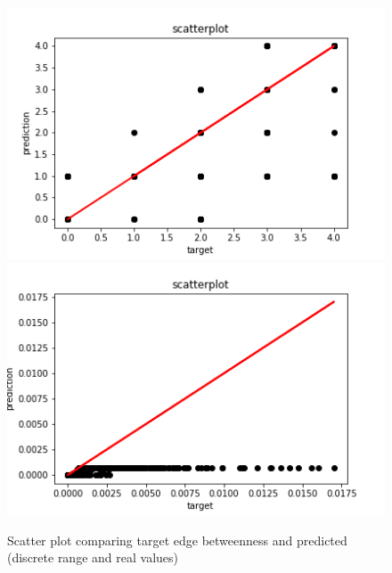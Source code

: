 \begin{figure}[H]
%
  \centering
    \includegraphics[width=0.9\linewidth]{img/GN_exp1/2019-09-28_22-02-07_META1_d4=19_d5=16_hus=10_eus=19_n1us=16_n2us=15_r=100_epochs=20_split-300-4000-10556-_scatterplot.png}
\endminipage
{}%
  \centering
    \includegraphics[width=0.9\linewidth]{img/GN_exp1/2019-09-28_22-02-07_META1_d4=19_d5=16_hus=10_eus=19_n1us=16_n2us=15_r=100_epochs=20_split-300-4000-10556-_scatterplot_real_eb.png}
\endminipage
\caption{Scatter plot comparing target edge betweenness and predicted (discrete range and real values)}\label{fig:edgeb_exp1_scatter}
\end{figure}


